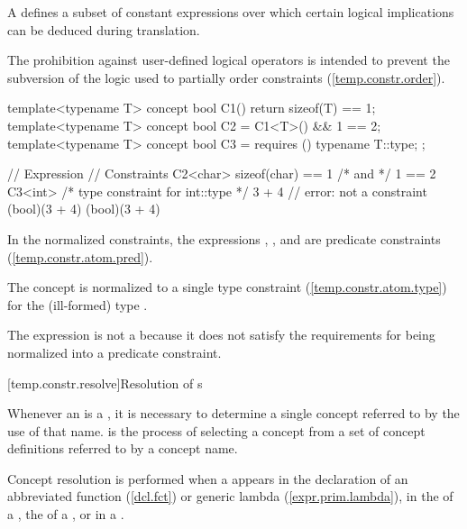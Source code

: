 \enternote
A  defines a subset of constant 
expressions over which certain logical implications can be deduced during 
translation.

The prohibition against user-defined logical operators is intended to
prevent the subversion of the logic used to partially order 
constraints (\ref{temp.constr.order}).
\exitnote

\enterexample
\begin{codeblock}
template<typename T> concept bool C1() { return sizeof(T) == 1; }
template<typename T> concept bool C2 = C1<T>() && 1 == 2;
template<typename T> concept bool C3 = requires () { typename T::type; };

// Expression      // Constraints
C2<char>           sizeof(char) == 1 /* and */ 1 == 2
C3<int>            /* type constraint for int::type */
3 + 4              // error: not a constraint
(bool)(3 + 4)      (bool)(3 + 4)
\end{codeblock}
In the normalized constraints, the expressions , 
, and  are predicate 
constraints (\ref{temp.constr.atom.pred}). 

The concept  is normalized to a single type constraint
(\ref{temp.constr.atom.type}) for the (ill-formed) 
type .

The expression  is not a 
 because it does
not satisfy the requirements for being normalized into a predicate 
constraint.
\exitexample


[temp.constr.resolve]{Resolution of s}

\pnum
Whenever an  is a , it is 
necessary to determine a single concept referred to by the use of that name.
% 
 is the process of selecting a concept 
from a set of concept definitions referred to by a concept name.

Concept resolution is performed when a 
 appears in
the declaration of an abbreviated function (\ref{dcl.fct})
or generic lambda (\ref{expr.prim.lambda}),
in the  of a
, the
 of a
, or
in a .

